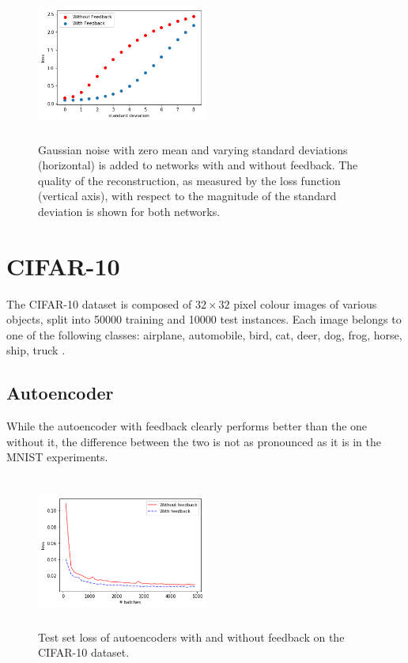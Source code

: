 \documentclass{article}
\begin{document}
  \begin{figure}
      \centering
      \includegraphics[width=0.5\textwidth,height=5cm,keepaspectratio]{img/actnoise_varstd.png}
      \caption{Gaussian noise with zero mean and varying standard deviations (horizontal) is added to networks with and without feedback. The quality of the reconstruction, as measured by the loss function (vertical axis), with respect to the magnitude of the standard deviation is shown for both networks. }
      \label{fig:noiseact}
  \end{figure}

  
\section{CIFAR-10}
The CIFAR-10 dataset is composed of $32\times32$ pixel colour images of various objects, split into 50000 training and 10000 test instances. Each image belongs to one of the following classes: airplane, automobile, bird, cat, deer, dog, frog, horse, ship, truck \cite{krizhevsky2014cifar}. 

\subsection{Autoencoder}

While the autoencoder with feedback clearly performs better than the one without it, the difference between the two is not as pronounced as it is in the MNIST experiments. 
\begin{figure}
      \centering
      \includegraphics[width=0.5\textwidth,height=5cm,keepaspectratio]{img/cifar_auto_test_loss.png}
      \caption{Test set loss of autoencoders with and without feedback on the CIFAR-10 dataset.}
      \label{fig:cifarauto}
  \end{figure}
\end{document}
